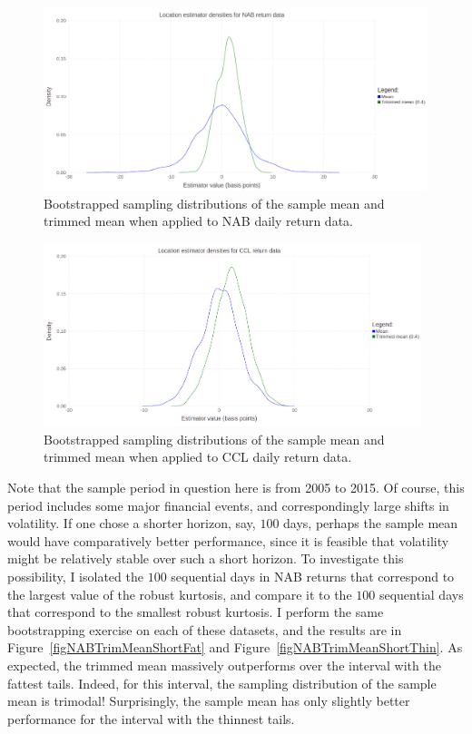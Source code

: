 \documentclass[12pt,a4paper]{amsart}
\begin{document}
\begin{figure}[htbp]
\centering
\includegraphics[height=5.35cm]{NABTrimMeanFullPeriod.png}
\caption{\footnotesize{Bootstrapped sampling distributions of the sample mean and trimmed mean when applied to NAB daily return data.}}
\label{figNABTrimMeanFullPeriod}
\end{figure}

\begin{figure}[htbp]
\centering
\includegraphics[height=5.35cm]{CCLTrimMeanFullPeriod.png}
\caption{\footnotesize{Bootstrapped sampling distributions of the sample mean and trimmed mean when applied to CCL daily return data.}}
\label{figCCLTrimMeanFullPeriod}
\end{figure}



Note that the sample period in question here is from 2005 to 2015. Of course, this period includes some major financial events, and correspondingly large shifts in volatility. If one chose a shorter horizon, say, $100$ days, perhaps the sample mean would have comparatively better performance, since it is feasible that volatility might be relatively stable over such a short horizon. To investigate this possibility, I isolated the $100$ sequential days in NAB returns that correspond to the largest value of the robust kurtosis, and compare it to the $100$ sequential days that correspond to the smallest robust kurtosis. I perform the same bootstrapping exercise on each of these datasets, and the results are in Figure~\ref{figNABTrimMeanShortFat} and Figure~\ref{figNABTrimMeanShortThin}. As expected, the trimmed mean massively outperforms over the interval with the fattest tails. Indeed, for this interval, the sampling distribution of the sample mean is trimodal! Surprisingly, the sample mean has only slightly better performance for the interval with the thinnest tails.
\end{document}
